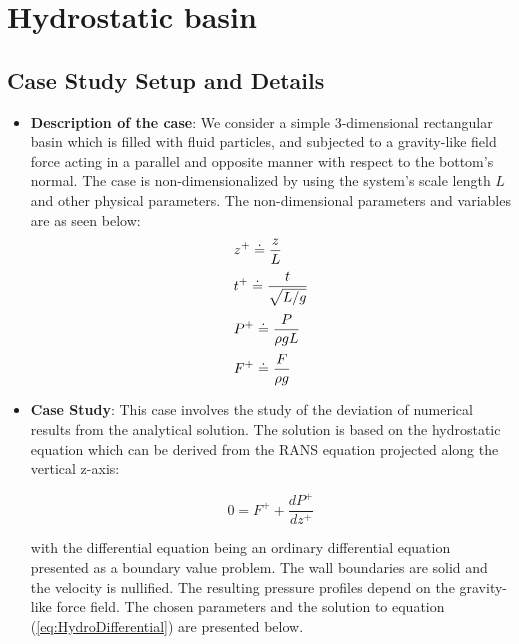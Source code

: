 \documentclass{../GPUSPHtemplate}
\begin{document}
\section{Hydrostatic basin}

\subsection{Case Study Setup and Details}
\vspace*{2pt}
\begin{itemize}
\item \textbf{Description of the case}: We consider a simple 3-dimensional rectangular basin which is
  filled with fluid particles, and subjected to a gravity-like field force acting in a parallel and
  opposite manner with respect to the bottom's normal. The case is non-dimensionalized by using the system's scale length $L$
  and other physical parameters. The non-dimensional parameters and variables are as seen below:   
  \begin{equation}
    \begin{array}{l}
      \displaystyle{  z^{+} \doteq \frac{z}{L} } \medskip \\ 
      \displaystyle{  t^{+} \doteq \frac{t}{\sqrt{L/g}} } \medskip \\ 
      \displaystyle{  P^{+} \doteq \frac{P}{\rho gL} } \medskip \\ 
      \displaystyle{  F^{+} \doteq \frac{F}{\rho g} } 
    \end{array}
  \end{equation}  
  
\item \textbf{Case Study}:  This case involves the study of the deviation of numerical results
  from the analytical solution. The solution is based on the hydrostatic equation which can be
  derived from the RANS equation projected along the vertical z-axis: 
  
  \begin{equation}\label{eq:HydroDifferential}
    0 = F^{+}+ \frac{d P^+}{d z^+}
  \end{equation}
  
  with the differential equation being an ordinary differential equation presented as a boundary value problem.
  The wall boundaries are solid and the velocity is nullified. The resulting pressure profiles
  depend on the gravity-like force field. The chosen parameters and
  the solution to equation (\ref{eq:HydroDifferential}) are presented below.
  

\end{itemize}
\end{document}
